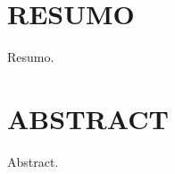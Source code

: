 
\chapter[RESUMO]{RESUMO}
{Resumo.}

\vspace*{2cm}

\newpage

\chapter[ABSTRACT]{ABSTRACT}
{Abstract.}